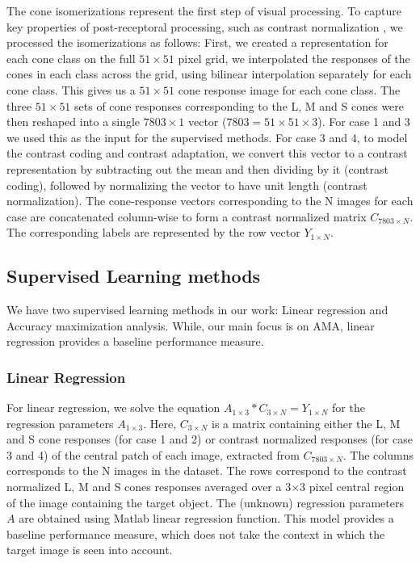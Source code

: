 \documentclass{jov}
\begin{document}
The cone isomerizations represent the first step of visual processing.  To capture key properties of post-receptoral processing, such as contrast normalization \cite{heeger1992normalization,albrecht1991motion,carandini2012normalization},
we processed the isomerizations as follows:
First, we created a representation for each cone class on the full $51 \times 51$ pixel grid, we interpolated the responses of the cones in each class across the grid, using bilinear interpolation separately for each cone class.
This gives us a $51 \times 51$ cone response image for each cone class.
The three $51 \times 51$ sets of cone responses corresponding to the L, M and S cones were then reshaped into a single $7803 \times 1$ vector ($7803 = 51 \times 51 \times 3$). For case 1 and 3 we used this as the input for the supervised methods. For case 3 and 4, to model the contrast coding and contrast adaptation, we convert this vector to a contrast representation by subtracting out the mean and then dividing by it (contrast coding), followed by normalizing the vector to have unit length (contrast normalization).
The cone-response vectors corresponding to the N images for each case are concatenated column-wise to form a contrast normalized matrix $C_{7803\times N}$. The corresponding labels are represented by the row vector $Y_{1\times N}$.

\subsection{Supervised Learning methods} \label{method:SupervisedLearning}
We have two supervised learning methods in our work: Linear regression and Accuracy maximization analysis. While, our main focus is on AMA, linear regression provides a baseline performance measure.

\subsubsection*{Linear Regression} For linear regression, we solve the equation $A_{1\times3}*C_{3\times N} = Y_{1\times N}$ for the regression parameters $A_{1\times3}$. Here, $C_{3\times N}$ is a matrix containing either the L, M and S cone responses (for case 1 and 2) or contrast normalized responses (for case 3 and 4) of the central patch of each image, extracted from $C_{7803\times N}$.  The columns corresponds to the N images in the dataset. The rows correspond to the contrast normalized L, M and S cones responses averaged over a 3$\times$3 pixel central region of the image containing the target object.  The (unknown) regression parameters $A$ are obtained using Matlab linear regression function. This model provides a baseline performance measure, which does not take the context in which the target image is seen into account.
\end{document}
